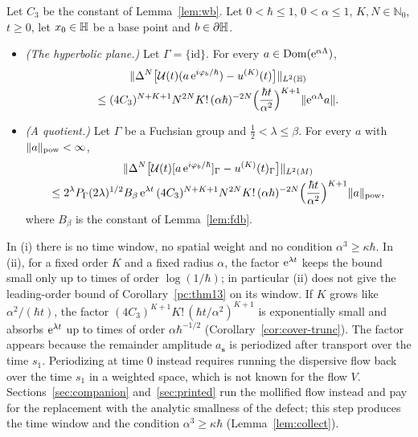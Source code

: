 \begin{proposition}\label{prop:cover}
Let $C_3$ be the constant of Lemma~\ref{lem:wb}. Let $0<\hbar\le1$, $0<\alpha\le1$, $K,N\in\mathbb N_0$, $t\ge0$, let $x_0\in\mathbb{H}$ be a
base point and $b\in\partial\mathbb{H}$.
\begin{itemize}
\item[\textup{(i)}] \emph{(The hyperbolic plane.)} Let $\Gamma=\{\mathrm{id}\}$. For every $a\in\operatorname{Dom}(\mathrm{e}^{\alpha\Lambda})$,
\begin{multline*}
\lVert \Delta^N\big[\mathcal{U}(t)(a\,\mathrm{e}^{i\varphi_b/\hbar})-u^{(K)}(t)\big]\rVert_{L^2(\mathbb{H})}\\
\le(4C_3)^{N+K+1}N^{2N}K!\,(\alpha\hbar)^{-2N}\Big(\frac{\hbar t}{\alpha^2}\Big)^{K+1}\lVert \mathrm{e}^{\alpha\Lambda}a\rVert.
\end{multline*}
\item[\textup{(ii)}] \emph{(A quotient.)} Let $\Gamma$ be a Fuchsian group and $\tfrac12<\lambda\le\beta$. For every $a$ with $\lVert a\rVert_{\mathrm{pow}}<\infty$,
\begin{multline*}
\lVert \Delta^N\big[\mathcal{U}(t)[a\,\mathrm{e}^{i\varphi_b/\hbar}]_\Gamma-u^{(K)}(t)_\Gamma\big]\rVert_{L^2(M)}\\
\le2^\lambda P_\Gamma(2\lambda)^{1/2}B_\beta\,\mathrm{e}^{\lambda t}\,(4C_3)^{N+K+1}N^{2N}K!\,(\alpha\hbar)^{-2N}\Big(\frac{\hbar t}{\alpha^2}\Big)^{K+1}\lVert a\rVert_{\mathrm{pow}},
\end{multline*}
where $B_\beta$ is the constant of Lemma~\ref{lem:fdb}.
\end{itemize}
\end{proposition}

In (i) there is no time window, no spatial weight and no condition $\alpha^3\ge\kappa\hbar$. In (ii), for a fixed order $K$ and a
fixed radius $\alpha$, the factor $\mathrm{e}^{\lambda t}$ keeps the bound small only up to times of order $\log(1/\hbar)$; in particular (ii)
does not give the leading-order bound of Corollary~\ref{pc:thm13} on its window. If $K$ grows like $\alpha^2/(\hbar t)$, the factor
$(4C_3)^{K+1}K!\,(\hbar t/\alpha^2)^{K+1}$ is exponentially small and absorbs $\mathrm{e}^{\lambda t}$ up to times of order $\alpha\hbar^{-1/2}$
(Corollary~\ref{cor:cover-trunc}). The factor appears because the remainder amplitude $a_{\mathbf s}$ is periodized
after transport over the time $s_1$. Periodizing at time $0$ instead requires running the dispersive flow back over the time $s_1$
in a weighted space, which is not known for the flow $V$. Sections~\ref{sec:companion} and~\ref{sec:printed} run the mollified flow
instead and pay for the replacement with the analytic smallness of the defect; this step produces the time window and the
condition $\alpha^3\ge\kappa\hbar$ (Lemma~\ref{lem:collect}).

